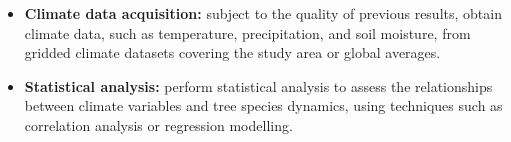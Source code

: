 \begin{itemize}
  \item \textbf{Climate data acquisition:} subject to the quality of previous results, obtain climate data, such as temperature, precipitation, and soil moisture, from gridded climate datasets covering the study area or global averages.
  
  \item \textbf{Statistical analysis:} perform statistical analysis to assess the relationships between climate variables and tree species dynamics, using techniques such as correlation analysis or regression modelling.
  
\end{itemize}